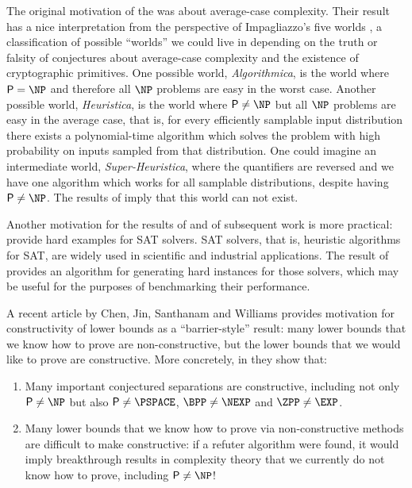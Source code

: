 The original motivation of the \cite{Gutfreund05} was about average-case complexity.
Their result has a nice interpretation from the perspective of Impagliazzo's five worlds 
\cite{Impagliazzo95}, a classification of possible ``worlds'' we could live in 
depending on the truth or falsity of conjectures about average-case complexity 
and the existence of cryptographic primitives. One possible world, \emph{Algorithmica},
is the world where $\PTIME = \NP$ and therefore all $\NP$ problems are easy in the worst case.
Another possible world, \emph{Heuristica}, is the world where $\PTIME \neq \NP$ but all
$\NP$ problems are easy in the average case, that is, for every efficiently samplable input
distribution there exists a polynomial-time algorithm which solves the problem with high probability
on inputs sampled from that distribution.
One could imagine an intermediate world, \emph{Super-Heuristica}, where the quantifiers are reversed
and we have one algorithm which works for all samplable distributions, despite having $\PTIME \neq \NP$. 
The results of \cite{Gutfreund05} imply that this world can not exist.

Another motivation for the results of \cite{Gutfreund05} and of subsequent work \cite{Bogdanov10} 
is more practical: provide hard examples for SAT solvers. SAT solvers, that is, heuristic algorithms
for SAT, are widely used in scientific and industrial applications.
The result of \cite{Gutfreund05} provides an algorithm for generating hard instances 
for those solvers, which may be useful for the purposes of benchmarking their performance. 

A recent article by Chen, Jin, Santhanam and Williams \cite{ConstructiveSeparations} 
provides motivation for constructivity of lower bounds as a ``barrier-style'' result:
many lower bounds that we know how to prove are non-constructive, but the lower bounds
that we would like to prove are constructive. More concretely, in \cite{ConstructiveSeparations}
they show that:

\begin{enumerate}
    \item Many important conjectured separations are constructive, including not only $\PTIME \neq \NP$ but
    also $\PTIME \neq \PSPACE$, $\BPP \neq \NEXP$ and $\ZPP \neq \EXP$.
    \item Many lower bounds that we know how to prove via non-constructive methods
    are difficult to make constructive: if a refuter algorithm were found, it would
    imply breakthrough results in complexity theory that we currently do not know how 
    to prove, including $\PTIME \neq \NP$!
\end{enumerate}

